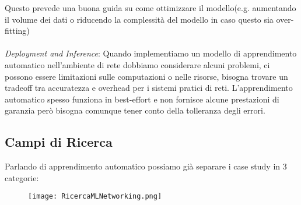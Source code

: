 \documentclass[../tesi.tex]{subfiles}
\begin{document}
Questo prevede una buona guida su come ottimizzare il modello(e.g. aumentando il volume dei dati o riducendo la complessità del modello in caso questo sia \Gls{over-fitting})\\
\\
\textit{Deployment and Inference}: Quando implementiamo un modello di apprendimento automatico nell’ambiente di rete dobbiamo considerare alcuni problemi, ci possono essere limitazioni sulle computazioni o nelle risorse, bisogna trovare un tradeoff tra accuratezza e overhead per i sistemi pratici di reti. L’apprendimento automatico spesso funziona in best-effort e non fornisce alcune prestazioni di garanzia però bisogna comunque tener conto della tolleranza degli errori.
\subsection{Campi di Ricerca}
Parlando di apprendimento automatico possiamo già separare i case study in 3 categorie:
\begin{figure}[htbp]
\center
\texttt{[image: RicercaMLNetworking.png]}
\caption{} 
\end{figure}
\\
\end{document}
